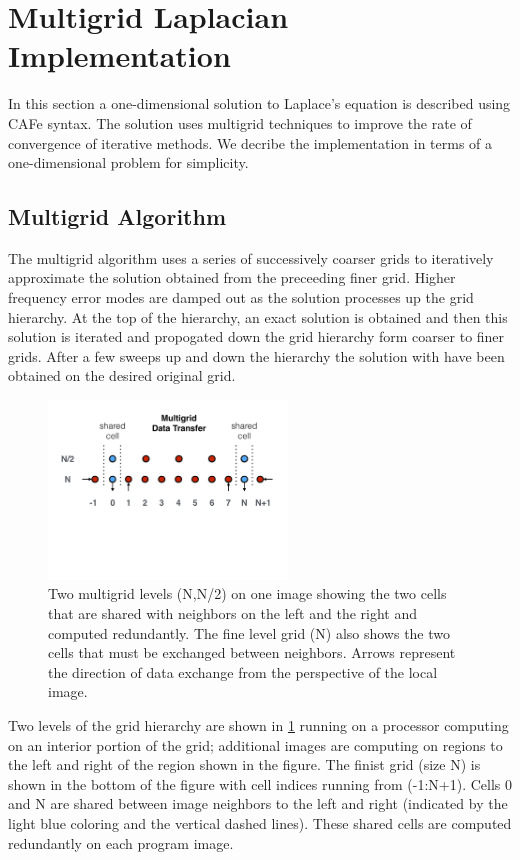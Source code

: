 \section{Multigrid Laplacian Implementation}

In this section a one-dimensional solution to Laplace's equation is described using CAFe
syntax.  The solution uses multigrid techniques to improve the rate of convergence
of iterative methods.  We decribe the implementation in terms of a one-dimensional
problem for simplicity.

\subsection{Multigrid Algorithm}

The multigrid algorithm uses a series of successively coarser grids to
iteratively approximate the solution obtained from the preceeding
finer grid.  Higher frequency error modes are damped out as the
solution processes up the grid hierarchy.  At the top of the
hierarchy, an exact solution is obtained and then this solution is
iterated and propogated down the grid hierarchy form coarser to finer
grids.  After a few sweeps up and down the hierarchy the solution with
have been obtained on the desired original grid.

\begin{figure}[!t]
\centering
\includegraphics[width=2.5in]{Fig1}
\caption{Two multigrid levels (N,N/2) on one image showing the two cells that are shared with
  neighbors on the left and the right and computed redundantly.  The fine level grid (N)
  also shows the two cells that must be exchanged between neighbors.  Arrows represent the direction
  of data exchange from the perspective of the local image.}
\label{fig_grids}
\end{figure}

Two levels of the grid hierarchy are shown in \ref{fig_grids} running on a processor computing on
an interior portion of the grid; additional images are computing on regions to the left and right of
the region shown in the figure.  The finist grid (size N) is shown
in the bottom of the figure with cell indices running from (-1:N+1).  Cells 0 and N are shared
between image neighbors to the left and right (indicated by the light blue coloring and the vertical
dashed lines).  These shared cells are computed redundantly on each program image.

